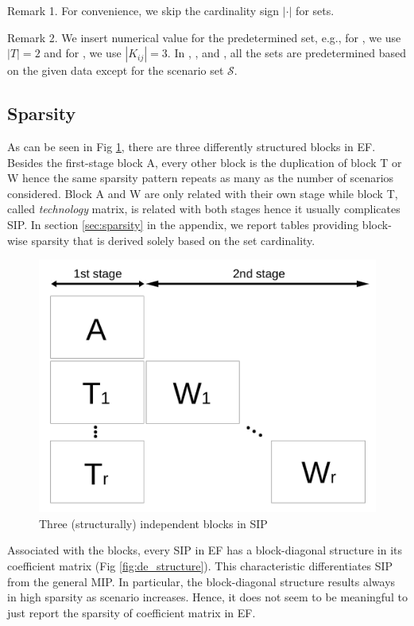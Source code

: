\begin{table}[H]
{\begin{threeparttable}
			\begin{tablenotes}
				\small
				\item Remark 1. For convenience, we skip the cardinality sign $|\cdot|$ for sets.
				\item Remark 2. We insert numerical value for the predetermined set, e.g., for \sizes, we use $|T|=2$ and for \mptsps, we use $|K_{ij}|=3$. In \airlift, \sdcp, and \suc, all the sets are predetermined based on the given data except for the scenario set $\mathcal{S}$.
			\end{tablenotes}
		\end{threeparttable}
	}
\end{table}

\subsection{Sparsity} \label{subsec:sparsity}
As can be seen in Fig \ref{fig:stagewise_sparsity}, there are three differently structured blocks in EF. Besides the first-stage block A, every other block is the duplication of block T or W hence the same sparsity pattern repeats as many as the number of scenarios considered. Block A and W are only related with their own stage while block T, called \textit{technology} matrix, is related with both stages hence it usually complicates SIP. In section \ref{sec:sparsity} in the appendix, we report tables providing block-wise sparsity that is derived solely based on the set cardinality.
\begin{figure}[H]
	\centering
	\includegraphics[width=0.5\linewidth]{drawings/stagewise_sparsity}
	\caption{Three (structurally) independent blocks in SIP}
	\label{fig:stagewise_sparsity}
\end{figure}
Associated with the blocks, every SIP in EF has a block-diagonal structure in its coefficient matrix (Fig \ref{fig:de_structure}). This characteristic differentiates SIP from the general MIP. In particular, the block-diagonal structure results always in high sparsity as scenario increases. Hence, it does not seem to be meaningful to just report the sparsity of coefficient matrix in EF.

